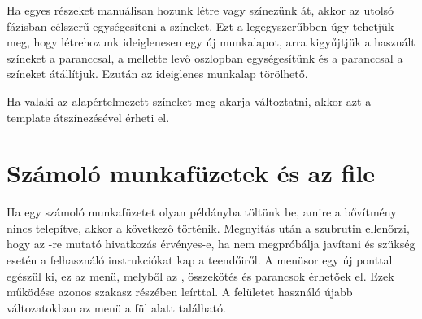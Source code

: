 Ha egyes részeket manuálisan hozunk létre vagy színezünk át, akkor az
utolsó fázisban 
célszerű egységesíteni a színeket. Ezt a legegyszerűbben úgy tehetjük
meg, hogy létrehozunk ideiglenesen egy új munkalapot, arra kigyűjtjük
a használt színeket a  paranccsal, a mellette levő
oszlopban egységesítünk és a  paranccsal a színeket 
átállítjuk. Ezután az ideiglenes munkalap törölhető.

Ha valaki az alapértelmezett színeket meg akarja változtatni, akkor
azt a  template átszínezésével érheti el. 

\section{Számoló munkafüzetek és az  file}
\label{sec:3.4}

Ha egy számoló munkafüzetet  olyan  példányba töltünk be,
amire a  bővítmény nincs telepítve, akkor a következő
történik. Megnyitás után a  
szubrutin ellenőrzi, hogy az -re mutató hivatkozás
érvényes-e, ha nem megpróbálja 
javítani és szükség esetén a felhasználó instrukciókat kap a
teendőiről. A menüsor egy új 
ponttal egészül ki, ez az  menü, melyből az , 
összekötés és  parancsok érhetőek el. Ezek
működése azonos  szakasz 
 részében leírttal. A  felületet használó újabb  változatokban az  menü a
 fül alatt található.

\endinput

